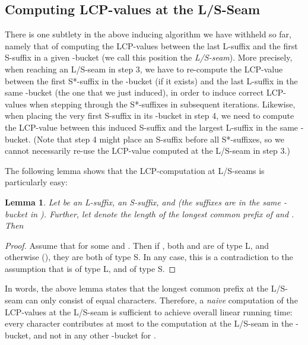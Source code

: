 \documentclass[11pt,onecolumn,final]{article} \usepackage[latin1]{inputenc}
\theoremstyle{plain}
\newtheorem{lemma}[definition]{Lemma}
\theoremstyle{remark}
\begin{document}
\subsection{Computing LCP-values at the L/S-Seam}
There is one subtlety in the above inducing algorithm we have withheld so far, namely that of computing the LCP-values between the last L-suffix and the first S-suffix in a given -bucket (we call this position the \emph{L/S-seam}). More precisely, when reaching an L/S-seam in step 3, we have to re-compute the LCP-value between the first S*-suffix in the -bucket (if it exists) and the last L-suffix in the same -bucket (the one that we just induced), in order to induce correct LCP-values when stepping through the S*-suffixes in subsequent iterations. Likewise, when placing the very first S-suffix in its -bucket in step 4, we need to compute the LCP-value between this induced S-suffix and the largest L-suffix in the same -bucket. (Note that step 4 might place an S-suffix before all S*-suffixes, so we cannot necessarily re-use the LCP-value computed at the L/S-seam in step 3.)

The following lemma shows that the LCP-computation at L/S-seams is particularly easy:

\begin{lemma}
  \label{lemma:ls_seam}
  Let  be an L-suffix,  an S-suffix, and  (the suffixes are in the same -bucket in ). Further, let  denote the length of the longest common prefix of  and . Then
  
\end{lemma}
\begin{proof}
  Assume that  for some  and . Then if , both  and  are of type L, and otherwise (), they are both of type S. In any case, this is a contradiction to the assumption that  is of type L, and  of type S.
\end{proof}

In words, the above lemma states that the longest common prefix at the L/S-seam can only consist of equal characters. Therefore, a \emph{naive} computation of the LCP-values at the L/S-seam is sufficient to achieve overall linear running time: every character  contributes at most to the computation at the L/S-seam in the -bucket, and not in any other -bucket for .
\end{document}
